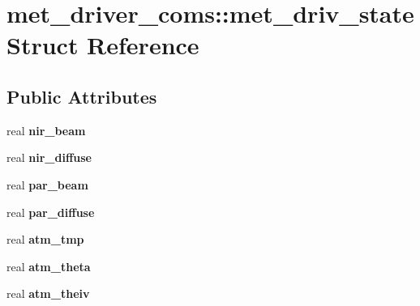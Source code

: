 \hypertarget{structmet__driver__coms_1_1met__driv__state}{
\section{met\_\-driver\_\-coms::met\_\-driv\_\-state Struct Reference}
\label{structmet__driver__coms_1_1met__driv__state}
}
\subsection*{Public Attributes}
\begin{DoxyCompactItemize}
\item 
\hypertarget{structmet__driver__coms_1_1met__driv__state_a94e16c4badc7e431bdb2fd9c7b67a542}{
real {\bfseries nir\_\-beam}}
\label{structmet__driver__coms_1_1met__driv__state_a94e16c4badc7e431bdb2fd9c7b67a542}

\item 
\hypertarget{structmet__driver__coms_1_1met__driv__state_aa6d71598746399cda26f69f9b132fe65}{
real {\bfseries nir\_\-diffuse}}
\label{structmet__driver__coms_1_1met__driv__state_aa6d71598746399cda26f69f9b132fe65}

\item 
\hypertarget{structmet__driver__coms_1_1met__driv__state_a2b50238d52991de8f4f06e9fb892d836}{
real {\bfseries par\_\-beam}}
\label{structmet__driver__coms_1_1met__driv__state_a2b50238d52991de8f4f06e9fb892d836}

\item 
\hypertarget{structmet__driver__coms_1_1met__driv__state_aee767e923de4d1f4ad21c22a96c25a87}{
real {\bfseries par\_\-diffuse}}
\label{structmet__driver__coms_1_1met__driv__state_aee767e923de4d1f4ad21c22a96c25a87}

\item 
\hypertarget{structmet__driver__coms_1_1met__driv__state_a6a1fcf8b9ea2b8d6b2ea94b49a10b6d6}{
real {\bfseries atm\_\-tmp}}
\label{structmet__driver__coms_1_1met__driv__state_a6a1fcf8b9ea2b8d6b2ea94b49a10b6d6}

\item 
\hypertarget{structmet__driver__coms_1_1met__driv__state_a9b1442c39d5321c185589c7c544c888d}{
real {\bfseries atm\_\-theta}}
\label{structmet__driver__coms_1_1met__driv__state_a9b1442c39d5321c185589c7c544c888d}

\item 
\hypertarget{structmet__driver__coms_1_1met__driv__state_a7c14953269b6f284ac234253ef333665}{
real {\bfseries atm\_\-theiv}}
\label{structmet__driver__coms_1_1met__driv__state_a7c14953269b6f284ac234253ef333665}


\end{DoxyCompactItemize}

